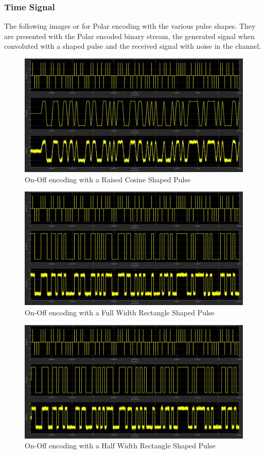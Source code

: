 \documentclass{article}
\begin{document}
\subsubsection{Time Signal}
The following images or for Polar encoding with the various pulse shapes. They
are presented with the Polar encoded binary stream, the generated signal when
convoluted with a shaped pulse and the received signal with noise in the channel.
\begin{figure}[H]
  \includegraphics[width = \linewidth]{Polar_Raised.jpg}
  \caption{On-Off encoding with a Raised Cosine Shaped Pulse}
  \label{fig:Polar-Raised}
\end{figure}
\begin{figure}[H]
  \includegraphics[width = \linewidth]{Polar_Rect_F.jpg}
  \caption{On-Off encoding with a Full Width Rectangle Shaped Pulse}
  \label{fig:Polar-Rect-F}
\end{figure}
\begin{figure}[H]
  \includegraphics[width = \linewidth]{Polar_Rect_H.jpg}
  \caption{On-Off encoding with a Half Width Rectangle Shaped Pulse}
  \label{fig:Polar-Rect-H}
\end{figure}
\end{document}
